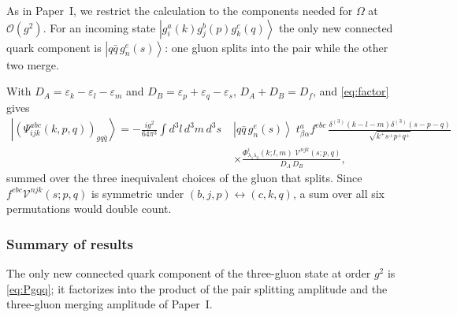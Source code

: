 \documentclass[11pt,a4paper]{article}
\numberwithin{equation}{section}
\newcommand{\eps}{\varepsilon}
\newcommand{\dthree}{\delta^{(3)}}
\newcommand{\ket}[1]{\left|#1\right\rangle}
\newcommand{\OM}{\Omega}
\newcommand{\Ph}{\Phi}
\newcommand{\Vg}{\mathcal{V}}
\newcommand{\qk}[3]{q^{#1}_{#2}(#3)}
\newcommand{\aqk}[3]{\bar q^{#1}_{#2}(#3)}
\newcommand{\gl}[3]{g^{#1}_{#2}(#3)}
\newcommand{\order}[1]{\mathcal{O}(#1)}
\begin{document}
As in Paper~I, we restrict the calculation to the components needed for $\OM$ at
$\order{g^{2}}$. For an incoming state $\ket{\gl{a}{i}{k}\gl{b}{j}{p}\gl{c}{k}{q}}$ the only new
connected quark component is $\ket{q\bar q\,\gl{e}{n}{s}}$: one gluon splits into the pair while
the other two merge.
\begin{center}
\end{center}
With $D_{A}=\eps_{k}-\eps_{l}-\eps_{m}$ and $D_{B}=\eps_{p}+\eps_{q}-\eps_{s}$, $D_{A}+D_{B}=D_{f}$,
and \eqref{eq:factor} gives
\begin{align}
\ket{(\Psi^{abc}_{ijk}(k,p,q))_{gq\bar q}}=-\frac{ig^{2}}{64\pi^{3}}
\int\!d^{3}l\,d^{3}m\,d^{3}s\;
&\ket{q\bar q\,\gl{e}{n}{s}}\;t^{a}_{\beta\alpha}f^{ebc}\,
\frac{\dthree(k-l-m)\dthree(s-p-q)}{\sqrt{k^{+}s^{+}p^{+}q^{+}}}
\nonumber\\&\times
\frac{\Ph^{i}_{\lambda_{1}\lambda_{2}}(k;l,m)\;\Vg^{njk}(s;p,q)}{D_{A}\,D_{B}} ,
\label{eq:Pgqq}
\end{align}
summed over the three inequivalent choices of the gluon that splits. Since
$f^{ebc}\Vg^{njk}(s;p,q)$ is symmetric under $(b,j,p)\leftrightarrow(c,k,q)$, a sum over all six
permutations would double count.

\subsubsection{Summary of results}

The only new connected quark component of the three-gluon state at order $g^{2}$ is
\eqref{eq:Pgqq}; it factorizes into the product of the pair splitting amplitude and the
three-gluon merging amplitude of Paper~I.

\end{document}
